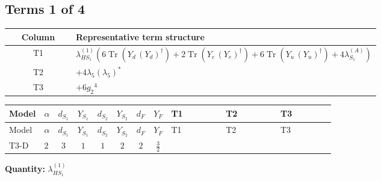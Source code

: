 \documentclass[8pt]{article}
\begin{document}
\begin{landscape}
\subsection*{Terms 1 of 4}
\begin{center}
\begin{tabular}{@{}c >{\raggedright\arraybackslash}p{0.82\linewidth}@{}}
\toprule
Column & Representative term structure \\
\midrule
T1 & \(\displaystyle {\lambda_{HS_1}^{(1)}} (6 \operatorname{Tr}\!\left({Y_d}\,\left({Y_d}\right)^{\dagger}\right)+2 \operatorname{Tr}\!\left({Y_e}\,\left({Y_e}\right)^{\dagger}\right)+6 \operatorname{Tr}\!\left({Y_u}\,\left({Y_u}\right)^{\dagger}\right)+4 {\lambda_{S_1}^{(A)}})\) \\
\midrule
T2 & \(\displaystyle +4 {\lambda_5} \left({\lambda_5}\right)^{*}\) \\
\midrule
T3 & \(\displaystyle +6 {g_2}^4\) \\
\midrule
\bottomrule
\end{tabular}
\end{center}
\smallskip
\tiny
\begin{longtable}{@{}llcccccc >{\raggedright\arraybackslash}p{0.21\linewidth} >{\raggedright\arraybackslash}p{0.21\linewidth} >{\raggedright\arraybackslash}p{0.21\linewidth}@{}}
\toprule
Model & $\alpha$ & $d_{S_1}$ & $Y_{S_1}$ & $d_{S_2}$ & $Y_{S_2}$ & $d_F$ & $Y_F$ & T1 & T2 & T3 \\
\midrule
\endfirsthead
\toprule
Model & $\alpha$ & $d_{S_1}$ & $Y_{S_1}$ & $d_{S_2}$ & $Y_{S_2}$ & $d_F$ & $Y_F$ & T1 & T2 & T3 \\
\midrule
\endhead
T3-D & $2$ & $3$ & $1$ & $1$ & $2$ & $2$ & $\frac{3}{2}$ & \scriptsize\adjustbox{max width=\linewidth}{$\begin{gathered} {\lambda_{HS_1}^{(1)}} (6 \operatorname{Tr}\!\left({Y_d}\,\left({Y_d}\right)^{\dagger}\right)+2 \operatorname{Tr}\!\left({Y_e}\,\left({Y_e}\right)^{\dagger}\right)+6 \operatorname{Tr}\!\left({Y_u}\,\left({Y_u}\right)^{\dagger}\right)+4 {\lambda_{S_1}^{(A)}})\end{gathered}$} & \scriptsize\adjustbox{max width=\linewidth}{$\begin{gathered} +4 {\lambda_5} \left({\lambda_5}\right)^{*}\end{gathered}$} & \scriptsize\adjustbox{max width=\linewidth}{$\begin{gathered} +6 {g_2}^4\end{gathered}$} \\
\midrule
\bottomrule
\end{longtable}
\clearpage
\noindent\textbf{Quantity: }$\lambda_{HS_1}^{(1)}$\par\smallskip

\end{landscape}
\end{document}
